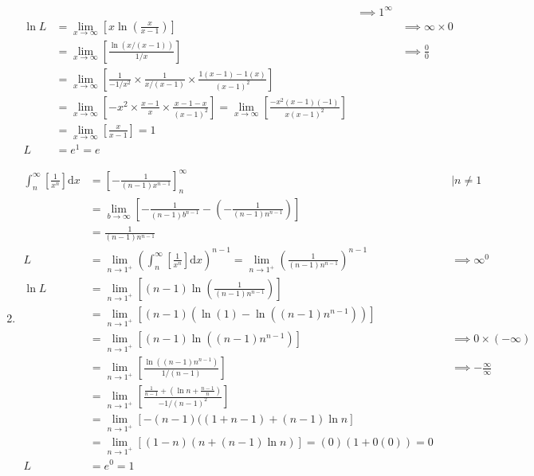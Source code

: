 \documentclass[12pt, A4]{report}
\renewcommand{\d}{\text{d}}
\begin{document}
\begin{enumerate}
\begin{align*}
								&&\implies 1^\infty \\
						\ln L &= \lim_{x\to\infty}\left[x\ln\left(\frac{x}{x - 1}\right)\right]
								&&\implies \infty \times 0 \\
							&= \lim_{x\to\infty}\left[\frac{\ln(x/(x - 1))}{1/x}\right]
								&&\implies \frac{0}{0} \\
							&= \lim_{x\to\infty}\left[\frac{1}{-1/x^2} \times \frac{1}{x/(x - 1)} \times \frac{1(x - 1) - 1(x)}{(x - 1)^2}\right] \\
							&= \lim_{x\to\infty}\left[-x^2 \times \frac{x - 1}{x} \times \frac{x - 1 - x}{(x - 1)^2}\right]
								= \lim_{x\to\infty}\left[\frac{-x^2(x - 1)(-1)}{x(x - 1)^2}\right] \\
							&= \lim_{x\to\infty}\left[\frac{x}{x - 1}\right] = 1 \\
						L &= e^1 = e
					\end{align*}
				\item
					\begin{align*}
						\int_n^{\infty}\left[\frac{1}{x^n}\right]\d x &= \left[-\frac{1}{(n - 1)x^{n - 1}}\right]_n^\infty 
								&&\mid n \ne 1 \\
							&= \lim_{b\to\infty}\left[-\frac{1}{(n - 1)b^{n - 1}} - \left(-\frac{1}{(n - 1)n^{n - 1}}\right)\right] \\
							&= \frac{1}{(n - 1)n^{n - 1}} \\
						L &= \lim_{n\to 1^+}\left(\int_n^{\infty}\left[\frac{1}{x^n}\right]\d x\right)^{n - 1}
								= \lim_{n\to 1^+}\left(\frac{1}{(n - 1)n^{n - 1}}\right)^{n - 1}
								&&\implies \infty^0 \\
						\ln L &= \lim_{n\to 1^+}\left[(n - 1)\ln\left(\frac{1}{(n - 1)n^{n - 1}}\right)\right] \\
								&= \lim_{n\to 1^+}\left[(n - 1)\left(\ln(1) - \ln\left((n - 1)n^{n - 1}\right)\right)\right] \\
								&= \lim_{n\to 1^+}\left[(n - 1)\ln\left((n - 1)n^{n - 1}\right)\right]
									&&\implies 0 \times (-\infty) \\
							&= \lim_{n\to 1^+}\left[\frac{\ln\left((n - 1)n^{n - 1}\right)}{1/(n - 1)}\right]
								&&\implies -\frac{\infty}{\infty} \\
							&= \lim_{n\to 1^+}\left[\frac{\frac{1}{n - 1} + \left(\ln n + \frac{n - 1}{n}\right)}{-1/(n - 1)^2}\right] \\
							&= \lim_{n\to 1^+}[-(n - 1)((1 + n - 1) + (n - 1)\ln n] \\
							&= \lim_{n\to 1^+}[(1 - n)(n + (n - 1)\ln n)] = (0)(1 + 0(0)) = 0 \\ 
							L &= e^0 = 1
					\end{align*}
			\end{enumerate}
\end{document}
